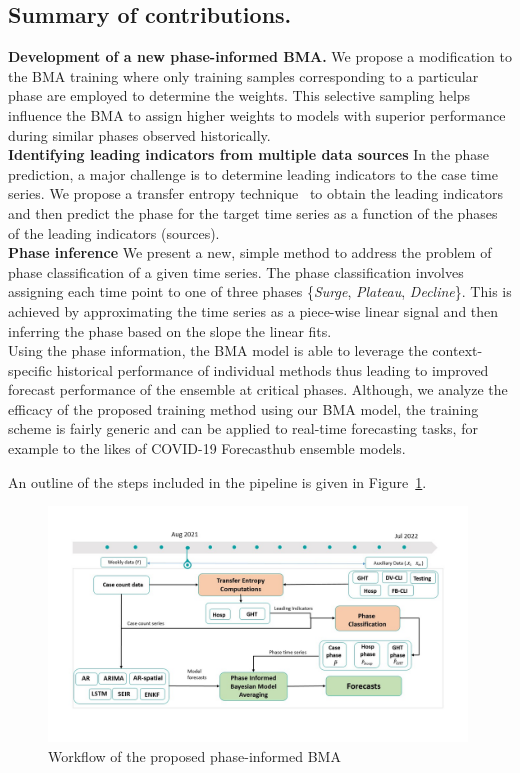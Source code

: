 \documentclass[conference,compsoc]{IEEEtran}
\begin{document}
\subsection{Summary of contributions.}
\noindent
\textbf{Development of a new phase-informed BMA.}
We propose a modification to the BMA training where only training samples corresponding to a particular phase are employed to determine the weights. This selective sampling helps influence the BMA to assign higher weights to models with superior performance during similar phases observed historically. 
\\
\textbf{Identifying leading indicators from multiple data sources}
In the phase prediction, a major challenge is to determine leading indicators to the case time series. We propose a transfer entropy technique~\cite{schreiber2000measuring} to obtain the leading indicators and then predict the phase for the target time series as a function of the phases of the leading indicators (sources). 
\\
\textbf{Phase inference}
We present a new, simple method to address the problem of phase classification of a given time series. The phase classification involves assigning each time point to one of three phases \{\emph{Surge}, \emph{Plateau}, \emph{Decline}\}. This is achieved by approximating the time series as a piece-wise linear signal and then inferring the phase based on the slope the linear fits. 
\\
Using the phase information, the BMA model is able to leverage the context-specific historical performance of individual methods thus leading to improved forecast performance of the ensemble at critical phases. 
Although, we analyze the efficacy of the proposed training method using our BMA model, the training scheme is fairly generic and can be applied to real-time forecasting tasks, for example to the likes of COVID-19 Forecasthub ensemble models.


An outline of the steps included in the pipeline is given in Figure~\ref{fig:pipeline}.
\begin{figure}[!t]
    \centering
    \includegraphics[width=0.99\textwidth]{figs/flow-diagram.jpeg}
    \caption{Workflow of the proposed phase-informed BMA}
    \label{fig:pipeline}
\end{figure}
\end{document}
